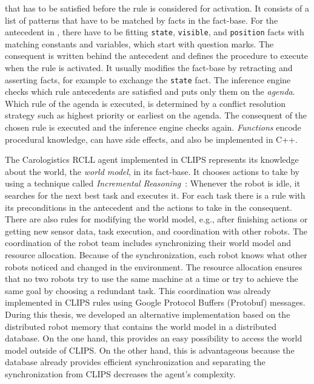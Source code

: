 that has to be satisfied before the rule is considered for activation.
It consists of a list of patterns that have to be matched by facts in
the fact-base. For the antecedent in , there
have to be fitting \texttt{state}, \texttt{visible}, and
\texttt{position} facts with matching constants and variables, which
start with question marks. The consequent is written behind the
antecedent and defines the procedure to execute when the rule is
activated. It usually modifies the fact-base by retracting and
asserting facts, for example to exchange the \texttt{state} fact. The
inference engine checks which rule antecedents are satisfied and puts
only them on the \emph{agenda}. Which rule of the agenda is executed,
is determined by a conflict resolution strategy such as highest
priority or earliest on the agenda. The consequent of the chosen rule
is executed and the inference engine checks again. \emph{Functions}
encode procedural knowledge, can have side effects, and also be
implemented in C++.

The Carologistics RCLL agent implemented in CLIPS represents its
knowledge about the world, the \emph{world model}, in its
fact-base. It chooses actions to take by using a technique called
\emph{Incremental Reasoning}~\cite{CLIPS-Agent}: Whenever the robot is
idle, it searches for the next best task and executes it.  For each
task there is a rule with its preconditions in the antecedent and the
actions to take in the consequent. There are also rules for modifying
the world model, e.g., after finishing actions or getting new sensor
data, task execution, and coordination with other robots.  The
coordination of the robot team includes synchronizing their world
model and resource allocation. Because of the synchronization, each
robot knows what other robots noticed and changed in the
environment. The resource allocation ensures that no two robots try to
use the same machine at a time or try to achieve the same goal by
choosing a redundant task. This coordination was already implemented
in CLIPS rules using Google Protocol Buffers (Protobuf)
messages. During this thesis, we developed an alternative
implementation based on the distributed robot memory that contains the
world model in a distributed database. On the one hand, this provides
an easy possibility to access the world model outside of CLIPS. On the
other hand, this is advantageous
because the database already provides efficient synchronization and
separating the synchronization from CLIPS decreases the
agent's complexity.

